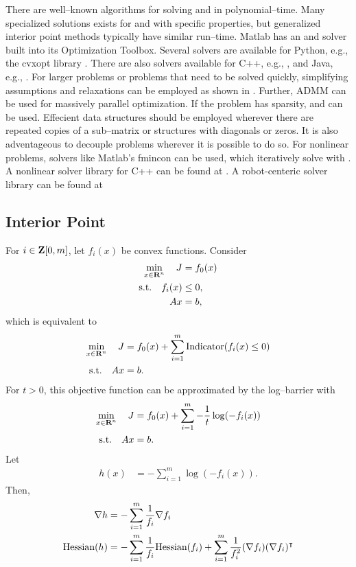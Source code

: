 \documentclass{article}
\begin{document}
    There are well--known algorithms for solving \LP and \QP in polynomial--time.
    Many specialized solutions exists for \LP and \QP with specific properties,
    but generalized interior point methods \cite[p.~569]{bv_cvxbook} typically have similar run--time.
    Matlab has an \LP \cite{matlab_lp} and \QP \cite{matlab_qp} 
    solver built into its Optimization Toolbox.
    Several \QP solvers are available for Python, e.g.,
    the cvxopt library \cite{cvx_opt}.
    There are also \QP solvers available for C++, e.g., \cite{cpp_qp},
    and Java, e.g., \cite{java_qp}. For larger problems or problems that need to be solved quickly,  
    simplifying assumptions and relaxations can be employed as shown in \cite{l1l2}.
    Further, ADMM \cite{admm} can be used for massively parallel optimization.
    If the problem has sparsity, \cite{sparse} and \cite{sparse_lp} can be used.
    Effecient data structures should be employed
    wherever there are repeated copies of a sub--matrix 
    or structures with diagonals or zeros.  
    It is also adventageous to decouple problems wherever it is possible to do so.
    For nonlinear problems, solvers like Matlab's fmincon \cite{matlab_fmincon}
    can be used, which iteratively solve with \QP.
    A nonlinear solver library for C++ can be found at \cite{ceres}.
    A robot-centeric solver library can be found at \cite{roboptim}

\subsection{Interior Point}

    For $i\in\textbf{Z}[0,m]$, let $f_i(x)$ be convex functions.  Consider
    \begin{align*}
        \min_{x\in\textbf{R}^n}\quad J&=f_0(x)\\
        \text{s.t.}\quad f_i(x)&\leq 0,\\
        A x &= b,
    \end{align*}
    which is equivalent to
    \begin{align}
        \min_{x\in\textbf{R}^n}\quad J&=f_0(x)+\sum_{i=1}^{m} \text{Indicator}(f_i(x)\leq 0)\\
        \text{s.t.}\quad A x &= b.\nonumber
    \end{align}
    For $t>0$, this objective function can be approximated by the log--barrier with
    \begin{align}
        \min_{x\in\textbf{R}^n}\quad J&=f_0(x)+\sum_{i=1}^{m} -\frac{1}{t}\log(-f_i(x))\\
        \text{s.t.}\quad A x &= b.\nonumber
    \end{align}
    Let
    \begin{align}
        h(x)&=-\sum_{i=1}^m \log(-f_i(x)).\label{eqn:log_barrier}
    \end{align}
    Then,
    \begin{align*}
        \nabla h &= -\sum_{i=1}^m \frac{1}{f_i}\nabla f_i\\
        \text{Hessian}(h) &= -\sum_{i=1}^m \frac{1}{f_i}\text{Hessian}(f_i)+
        \sum_{i=1}^m \frac{1}{f_i^2}(\nabla f_i)(\nabla f_i)^\intercal        
    \end{align*}
\end{document}
